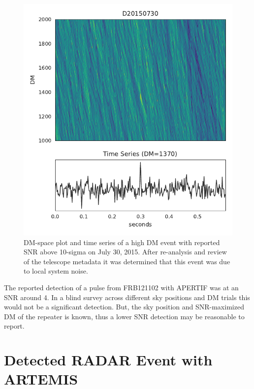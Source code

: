 \documentclass[a4paper,fleqn,usenatbib]{mnras}
\begin{document}
\begin{figure}
    \includegraphics[width=1.0\linewidth]{figures/D20150730_buf23_Beam6_dmtrial.pdf}
    \caption{DM-space plot and time series of a high DM event with reported SNR
    above 10-sigma on July 30, 2015. After re-analysis and review of the
    telescope metadata it was determined that this event was due to local system
    noise.
    }
    \label{fig:D20150730}
\end{figure}

The reported detection of a pulse from FRB121102 with APERTIF \citep{Atel10693}
was at an SNR around 4. In a blind survey across different sky positions and DM
trials this would not be a significant detection. But, the sky position and
SNR-maximized DM of the repeater is known, thus a lower SNR detection may be
reasonable to report.

\section{Detected RADAR Event with ARTEMIS}
\label{sec:LOFAR_RADAR}
\end{document}
